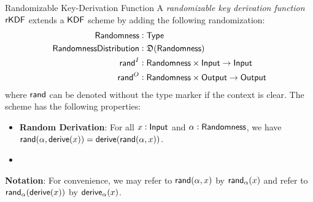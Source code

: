 \begin{definitiontoc}{Randomizable Key-Derivation Function}
    A \emph{randomizable key derivation function} ${\textsf{rKDF}}$ extends a ${\textsf{KDF}}$ scheme by adding the following randomization:
    \begin{align*}
        {\textsf{Randomness}}             &: {\textsf{Type}} \\
        {\textsf{RandomnessDistribution}} &: \mathfrak{D}({\textsf{Randomness}}) \\
        {\textsf{rand}}^I                 &: {\textsf{Randomness}} \times {\textsf{Input}} \to {\textsf{Input}} \\
        {\textsf{rand}}^O                 &: {\textsf{Randomness}} \times {\textsf{Output}} \to {\textsf{Output}}
    \end{align*}
    where ${\textsf{rand}}$ can be denoted without the type marker if the context is clear. The scheme has the following properties:
    \begin{itemize}
        \item \textbf{Random Derivation}: For all $x : {\textsf{Input}}$ and $\alpha : {\textsf{Randomness}}$, we have ${\textsf{rand}}(\alpha, {\textsf{derive}}(x)) = {\textsf{derive}}({\textsf{rand}}(\alpha, x))$.
        \item {}
    \end{itemize}

    \textbf{Notation}: For convenience, we may refer to ${\textsf{rand}}(\alpha, x)$ by ${\textsf{rand}}_\alpha(x)$ and refer to ${\textsf{rand}}_\alpha({\textsf{derive}}(x))$ by ${\textsf{derive}}_\alpha(x)$.
\end{definitiontoc}

